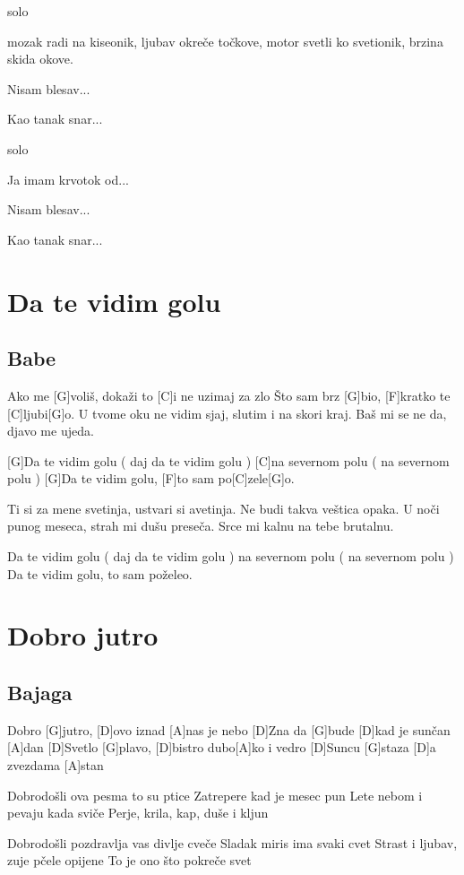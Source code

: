 \documentclass[a4paper,12pt]{article}
\begin{document}
\begin{multicols}{2}
\begin{guitar}
solo

mozak radi na kiseonik,
ljubav okreče točkove,
motor svetli ko svetionik,
brzina skida okove.

Nisam blesav...

Kao tanak snar...

solo

Ja imam krvotok od...

Nisam blesav...

Kao tanak snar... 
\end{guitar}
\section{Da te vidim golu}
\subsection*{Babe}
\begin{guitar}
Ako me [G]voliš, dokaži to [C]i ne uzimaj za zlo
Što sam brz [G]bio, [F]kratko te [C]ljubi[G]o.
U tvome oku ne vidim sjaj, slutim i na skori kraj.
Baš mi se ne da, djavo me ujeda.

	     
[G]Da te vidim golu  ( daj da te vidim golu ) 
[C]na severnom polu ( na severnom polu ) 
[G]Da te vidim golu, [F]to sam po[C]zele[G]o.

Ti si za mene svetinja, ustvari si avetinja.
Ne budi takva veštica opaka.
U noči punog meseca, strah mi dušu preseča.
Srce mi kalnu na tebe brutalnu.

Da te vidim golu ( daj da te vidim golu ) 
na severnom polu ( na severnom polu )
Da te vidim golu, to sam poželeo.

\end{guitar}
\section{Dobro jutro}
\subsection*{Bajaga}
\begin{guitar}
[D]Dobro [G]jutro, [D]ovo iznad [A]nas je nebo
[D]Zna da [G]bude [D]kad je sunčan [A]dan
[D]Svetlo [G]plavo, [D]bistro dubo[A]ko i vedro
[D]Suncu [G]staza [D]a zvezdama [A]stan


Dobrodošli ova pesma to su ptice
Zatrepere kad je mesec pun
Lete nebom i pevaju kada sviče
Perje, krila, kap, duše i kljun


Dobrodošli pozdravlja vas divlje cveče
Sladak miris ima svaki cvet
Strast i ljubav, zuje pčele opijene
To je ono što pokreče svet


\end{guitar}
\end{multicols}
\end{document}
